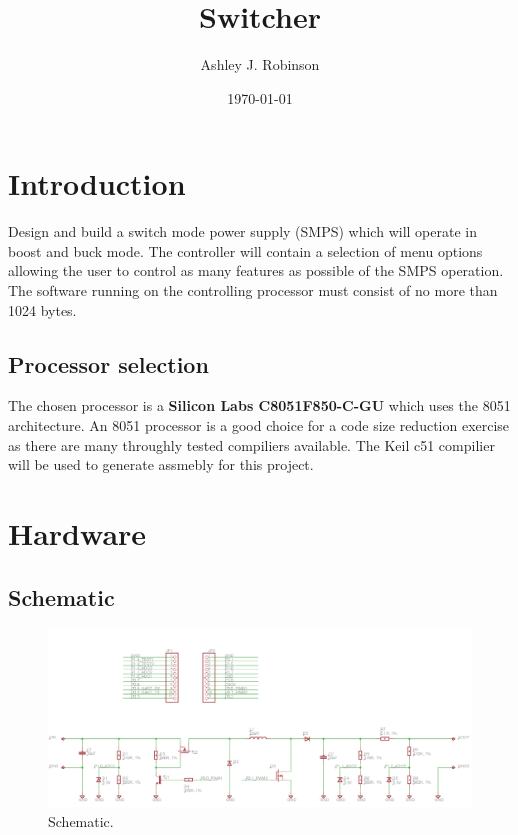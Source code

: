 \documentclass[12pt]{article}%
\begin{document}
\title{Switcher}
\author{Ashley J. Robinson}
\date{\today}
\maketitle
\section{Introduction}

Design and build a switch mode power supply (SMPS) which will operate in boost and buck mode. The controller will contain a selection of menu options allowing the user to control as many features as possible of the SMPS operation. The software running on the controlling processor must consist of no more than 1024 bytes.

\subsection{Processor selection}

The chosen processor is a \textbf{Silicon Labs C8051F850-C-GU} which uses the 8051 architecture. An 8051 processor is a good choice for a code size reduction exercise as there are many throughly tested compiliers available. The Keil c51 compilier will be used to generate assmebly for this project.

\section{Hardware}

\subsection{Schematic}

\begin{figure}[H]
	\centering
  	\includegraphics[width=16cm]{sch.png}
  	\caption{Schematic.}
  	\label{fig:sch}
\end{figure}
\end{document}
